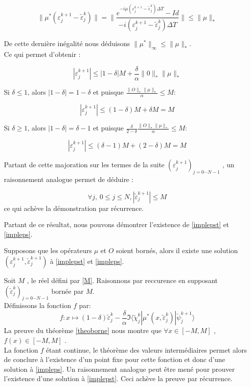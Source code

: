\begin{ proof }
	$$ \lVert \mu^* ( \varepsilon_j^{k+1} - \tilde{\varepsilon}_j^k) \rVert = \lVert \frac{e^{-i \mu( \varepsilon_j^{k+1} - \tilde{\varepsilon}_j^k)\Delta T}-Id}{-i ( \varepsilon_j^{k+1} - \tilde{\varepsilon}_j^k)\Delta T} \rVert \leq \lVert \mu \rVert_*  $$
	
	De cette dernière inégalité nous déduisons $ \lVert \mu^* \rVert_{\infty} \leq  \lVert \mu \rVert_*  $.\\ Ce qui permet d'obtenir :
	
	$$
	|\varepsilon_j^{k+1}| \leq |1-\delta|M + \frac{\delta}{\alpha} \lVert 0 \rVert_* \lVert \mu \rVert_{*}
	$$
	
	Si $\delta \leq 1$, alors $|1-\delta| = 1-\delta$ et puisque $\frac{\lVert O \rVert_* \lVert \mu \rVert_* }{\alpha} \leq M$:
	
	$$ |\varepsilon_j^{k+1} | \leq (1-\delta)M + \delta M = M $$
	
	Si $\delta \geq 1$, alors $|1-\delta| = \delta - 1$ et puisque $\frac{\delta}{2-\delta} \frac{\lVert O \rVert_* \lVert \mu \rVert_* }{\alpha} \leq M$:
	
	$$ |\varepsilon_j^{k+1} | \leq (\delta-1)M + (2-\delta) M = M $$
	
	Partant de cette majoration sur les termes de la suite $ (\varepsilon_j^{k+1})_{j=0\cdots N-1} $ , un raisonnement analogue permet de déduire :
	
	$$ \forall j,\ 0 \leq j \leq N, |\tilde{\varepsilon}_j^{k+1} | \leq M $$
	ce qui achève la démonstration par récurrence.
\end{ proof }

Partant de ce résultat, nous pouvons démontrer l’existence de \eqref{implepst} et \eqref{impleps}.

\begin{theorem}
	Supposons que les opérateurs $\mu$ et $O$ soient bornés, alors il existe une solution $ ( \varepsilon_j^{k+1}, \tilde{\varepsilon}_j^{k+1} ) $ à \eqref{implepst} et \eqref{impleps}.
\end{theorem}

\begin{ proof }
	
	Soit $M$ , le réel défini par \eqref{M}. Raisonnons par reccurence en supposant  
	$(\tilde{\varepsilon}_j^k)_{j=0\cdots N-1}$ bornée par $M$.\\
	Définissons la fonction $f$ par:
	\begin{equation} \label{f}
	f: x \mapsto (1-\delta)\tilde{\varepsilon}^k_j - \frac{\delta}{\alpha}\Im \langle  \tilde{\chi}^k_{j}|\mu^*(x,\tilde{\varepsilon}^k_j)|\breve{\psi}^{k+1}_{j} \rangle
	\end{equation}
	La preuve du théorème \ref{theoborne} nous montre que $\forall x \in [-M, M ]$ , $f(x) \in [-M, M ]$ .\\
	La fonction $f$ étant continue, le théorème des valeurs intermédiaires permet alors de conclure à l'existence d’un point fixe pour cette fonction et donc d’une solution à \eqref{impleps}. Un raisonnement analogue peut être mené pour prouver l'existence d’une solution à \eqref{implepst}. Ceci achève la preuve par récurrence.
	
\end{ proof }

